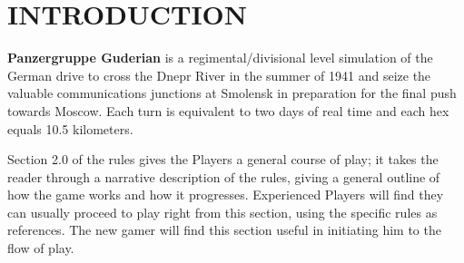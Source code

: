 \section{INTRODUCTION}

\textbf{Panzergruppe Guderian} is a regimental/divisional level simulation of the German drive to cross the Dnepr River in the summer of 1941 and seize the valuable communications junctions at Smolensk in preparation for the final push towards Moscow. Each turn is equivalent to two days of real time and each hex equals 10.5 kilometers.

Section 2.0 of the rules gives the Players a general course of play; it takes the reader through a narrative description of the rules, giving a general outline of how the game works and how it progresses. Experienced Players will find they can usually proceed to play right from this section, using the specific rules as references. The new gamer will find this section useful in initiating him to the flow of play.